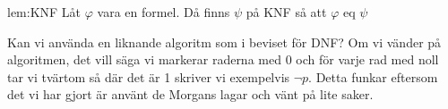 \begin{lem}{lem:KNF}
  Låt $\varphi$ vara en formel. Då finns $\psi$ på KNF så att $\varphi$ eq $\psi$
\end{lem}
\par\bigskip
\noindent Kan vi använda en liknande algoritm som i beviset för DNF? Om vi vänder på algoritmen, det vill säga vi markerar raderna med 0 och för varje rad med noll tar vi tvärtom så där det är 1 skriver vi exempelvis $\neg p$. Detta funkar eftersom det vi har gjort är använt de Morgans lagar och vänt på lite saker.






